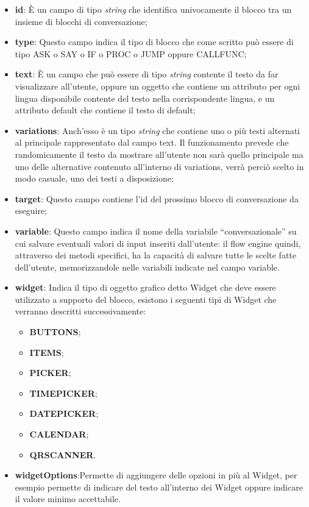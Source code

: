 \begin{itemize}
	\item \textbf{id}: È un campo di tipo \emph{string} che identifica univocamente il blocco tra un insieme di blocchi di conversazione;
	\item \textbf{type}: Questo campo indica il tipo di blocco che come scritto può essere di tipo ASK
	 o SAY o IF o PROC o JUMP oppure CALLFUNC;        
	\item \textbf{text}: È un campo che può essere di tipo \emph{string} contente il testo da far visualizzare all'utente, oppure un oggetto che contiene un attributo per ogni lingua disponibile contente del testo nella corrispondente lingua, e un attributo default che contiene il testo di default;
	\item \textbf{variations}: Anch'esso è un tipo \emph{string} che contiene uno o più testi alternati al principale rappresentato dal campo text. Il funzionamento prevede che randomicamente il testo da mostrare all'utente non sarà quello principale ma uno delle alternative contenuto all'interno di variations, verrà perciò scelto in modo casuale, uno dei testi a disposizione; 
	\item \textbf{target}: Questo campo contiene l'id del prossimo blocco di conversazione da eseguire;
	\item \textbf{variable}: Questo campo indica il nome della variabile “conversazionale” su cui salvare eventuali valori di input inseriti dall’utente: il flow engine quindi, attraverso dei metodi specifici, ha la capacità di salvare tutte le scelte fatte dell’utente, memorizzandole nelle variabili indicate nel campo variable.
	\item \textbf{widget}: Indica il tipo di oggetto grafico detto Widget che deve essere utilizzato a supporto del blocco, esistono i seguenti tipi di Widget che verranno descritti successivamente:
	\begin{itemize}
		\item \textbf{BUTTONS};
		\item \textbf{ITEMS};
		\item \textbf{PICKER};
		\item \textbf{TIMEPICKER};
		\item \textbf{DATEPICKER};
		\item \textbf{CALENDAR};
		\item \textbf{QRSCANNER}.
	\end{itemize}
	\item \textbf{widgetOptions}:Permette di aggiungere delle opzioni in più al Widget, per esempio permette di indicare del testo all'interno dei Widget oppure indicare il valore minimo accettabile.
\end{itemize} 


